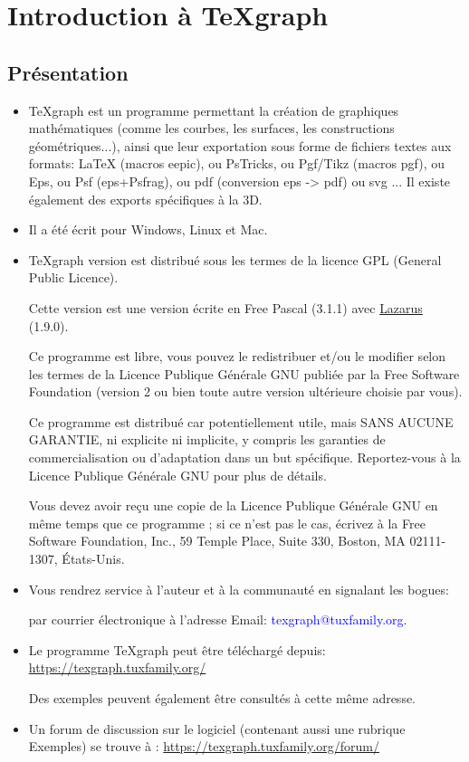 \chapter{Introduction à TeXgraph}


\section{Présentation}

\begin{itemize}
\item TeXgraph est un programme permettant la création de graphiques mathématiques (comme les courbes, les surfaces, les constructions géométriques...), ainsi que leur exportation sous forme de fichiers textes aux formats: LaTeX (macros eepic), ou PsTricks, ou Pgf/Tikz (macros pgf), ou Eps, ou Psf (eps+Psfrag), ou pdf (conversion eps -> pdf) ou svg ... Il existe également des exports spécifiques à la 3D.


\item Il a été écrit pour Windows, Linux et Mac.

\item TeXgraph version \version est distribué sous les termes de la licence GPL (General Public Licence). 

Cette version est une version écrite en Free Pascal (3.1.1) avec \href{http://www.lazarus.freepascal.org/}{Lazarus} (1.9.0).

Ce programme est libre, vous pouvez le redistribuer et/ou le modifier selon les termes de la Licence Publique Générale GNU publiée par la Free Software Foundation (version 2 ou bien toute autre version ultérieure choisie par vous).

Ce programme est distribué car potentiellement utile, mais SANS AUCUNE GARANTIE, ni explicite ni implicite, y compris les garanties de commercialisation ou d'adaptation dans un but spécifique. Reportez-vous à la Licence Publique Générale GNU pour plus de détails.

Vous devez avoir reçu une copie de la Licence Publique Générale GNU en même temps que ce programme ; si ce n'est pas le cas, écrivez à la Free Software Foundation, Inc., 59 Temple Place, Suite 330, Boston, MA 02111-1307, États-Unis.

\item Vous rendrez service à l'auteur et à la communauté en signalant les bogues:

 par courrier électronique à l'adresse Email: \textcolor{blue}{texgraph@tuxfamily.org}.

\item Le programme TeXgraph peut être téléchargé depuis: \url{https://texgraph.tuxfamily.org/}

Des exemples peuvent également être consultés à cette même adresse. 

\item Un forum de discussion  sur le logiciel (contenant aussi une rubrique Exemples) se trouve à : \url{https://texgraph.tuxfamily.org/forum/}

\end{itemize}

